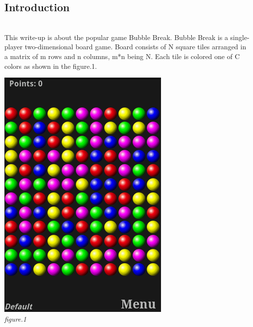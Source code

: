 \documentclass[twoside]{article}
\begin{document}
\begin{multicols}{2} %

\section{Introduction}
\lettrine[nindent=0em,lines=1]{}\\
This write-up is about the popular game Bubble Break.
Bubble Break is a single-player two-dimensional board game. Board consists of N square tiles
arranged in a matrix of m rows and n columns, m*n being N. Each tile is colored one of C colors
as shown in the figure.1.

\begin{center}
    \includegraphics[scale=0.25]{bubble.png}
    \\
    \emph{figure.1}
\end{center}


\end{multicols}
\end{document}
